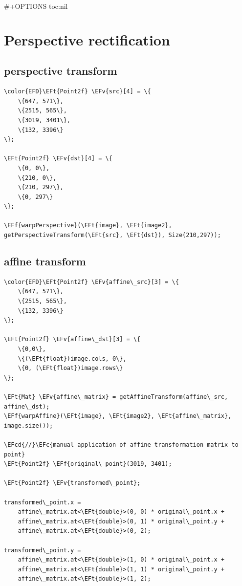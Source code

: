 \documentclass[11pt]{article}
\date{\today}
\title{}
\newcommand{\EFc}[1]{\textcolor{EFc}{#1}} %
\newcommand{\EFcd}[1]{\textcolor{EFcd}{#1}} %
\newcommand{\EFf}[1]{\textcolor{EFf}{#1}} %
\newcommand{\EFv}[1]{\textcolor{EFv}{#1}} %
\newcommand{\EFt}[1]{\textcolor{EFt}{#1}} %
\begin{document}
\tableofcontents

\#+OPTIONS toc:nil
\section{Perspective rectification}
\label{sec:org1b6ca63}
\subsection{perspective transform}
\label{sec:org2c850dc}

\begin{Code}
\begin{Verbatim}
\color{EFD}\EFt{Point2f} \EFv{src}[4] = \{
    \{647, 571\},
    \{2515, 565\},
    \{3019, 3401\},
    \{132, 3396\}
\};

\EFt{Point2f} \EFv{dst}[4] = \{
    \{0, 0\},
    \{210, 0\},
    \{210, 297\},
    \{0, 297\}
\};

\EFf{warpPerspective}(\EFt{image}, \EFt{image2}, getPerspectiveTransform(\EFt{src}, \EFt{dst}), Size(210,297));
\end{Verbatim}
\end{Code}
\subsection{affine transform}
\label{sec:orgd702e0f}

\begin{Code}
\begin{Verbatim}
\color{EFD}\EFt{Point2f} \EFv{affine\_src}[3] = \{
    \{647, 571\},
    \{2515, 565\},
    \{132, 3396\}
\};

\EFt{Point2f} \EFv{affine\_dst}[3] = \{
    \{0,0\},
    \{(\EFt{float})image.cols, 0\},
    \{0, (\EFt{float})image.rows\}
\};

\EFt{Mat} \EFv{affine\_matrix} = getAffineTransform(affine\_src, affine\_dst);
\EFf{warpAffine}(\EFt{image}, \EFt{image2}, \EFt{affine\_matrix}, image.size());

\EFcd{//}\EFc{manual application of affine transformation matrix to point}
\EFt{Point2f} \EFf{original\_point}(3019, 3401);

\EFt{Point2f} \EFv{transformed\_point};

transformed\_point.x =
    affine\_matrix.at<\EFt{double}>(0, 0) * original\_point.x +
    affine\_matrix.at<\EFt{double}>(0, 1) * original\_point.y +
    affine\_matrix.at<\EFt{double}>(0, 2);

transformed\_point.y =
    affine\_matrix.at<\EFt{double}>(1, 0) * original\_point.x +
    affine\_matrix.at<\EFt{double}>(1, 1) * original\_point.y +
    affine\_matrix.at<\EFt{double}>(1, 2);
\end{Verbatim}
\end{Code}
\end{document}
